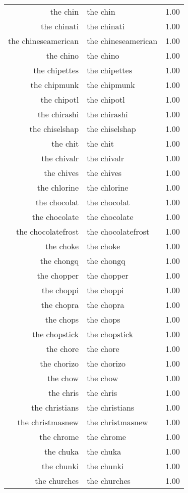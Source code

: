 \begin{table}[ht]
\begin{tabular}{rlr}
  the chin & the chin & 1.00 \\ 
  the chinati & the chinati & 1.00 \\ 
  the chineseamerican & the chineseamerican & 1.00 \\ 
  the chino & the chino & 1.00 \\ 
  the chipettes & the chipettes & 1.00 \\ 
  the chipmunk & the chipmunk & 1.00 \\ 
  the chipotl & the chipotl & 1.00 \\ 
  the chirashi & the chirashi & 1.00 \\ 
  the chiselshap & the chiselshap & 1.00 \\ 
  the chit & the chit & 1.00 \\ 
  the chivalr & the chivalr & 1.00 \\ 
  the chives & the chives & 1.00 \\ 
  the chlorine & the chlorine & 1.00 \\ 
  the chocolat & the chocolat & 1.00 \\ 
  the chocolate & the chocolate & 1.00 \\ 
  the chocolatefrost & the chocolatefrost & 1.00 \\ 
  the choke & the choke & 1.00 \\ 
  the chongq & the chongq & 1.00 \\ 
  the chopper & the chopper & 1.00 \\ 
  the choppi & the choppi & 1.00 \\ 
  the chopra & the chopra & 1.00 \\ 
  the chops & the chops & 1.00 \\ 
  the chopstick & the chopstick & 1.00 \\ 
  the chore & the chore & 1.00 \\ 
  the chorizo & the chorizo & 1.00 \\ 
  the chow & the chow & 1.00 \\ 
  the chris & the chris & 1.00 \\ 
  the christians & the christians & 1.00 \\ 
  the christmasnew & the christmasnew & 1.00 \\ 
  the chrome & the chrome & 1.00 \\ 
  the chuka & the chuka & 1.00 \\ 
  the chunki & the chunki & 1.00 \\ 
  the churches & the churches & 1.00 \\ 

\end{tabular}
\end{table}
